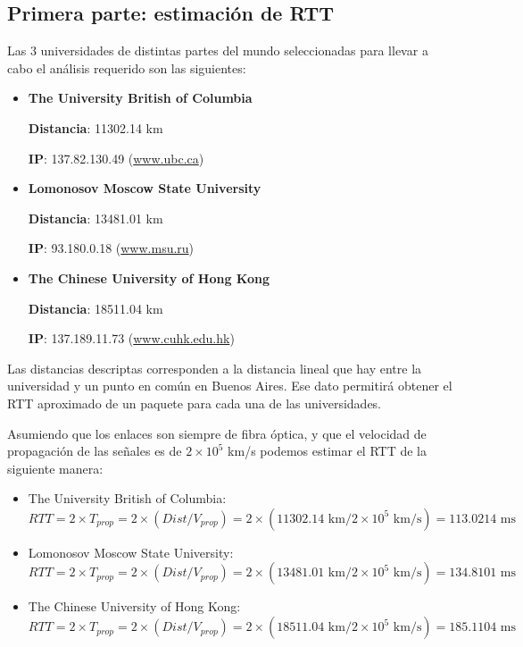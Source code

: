 \subsection{Primera parte: estimación de RTT}
Las 3 universidades de distintas partes del mundo seleccionadas para llevar a cabo el análisis requerido son las siguientes: 

\begin{itemize}
 \item {\bf The University British of Columbia}
 
	{\bf Distancia}: 11302.14 km 
	
	{\bf IP}: 137.82.130.49 (\url{www.ubc.ca}{})
 
 \item {\bf Lomonosov Moscow State University}

	{\bf Distancia}: 13481.01 km
	
	{\bf IP}: 93.180.0.18 (\url{www.msu.ru}{})
 
 \item {\bf The Chinese University of Hong Kong}

	{\bf Distancia}: 18511.04 km
	
	{\bf IP}: 137.189.11.73 (\url{www.cuhk.edu.hk})
 
\end{itemize}

Las distancias descriptas corresponden a la distancia lineal que hay entre la universidad y un punto en común en Buenos Aires. Ese dato permitirá obtener el RTT aproximado de un paquete para cada una de las universidades. 

Asumiendo que los enlaces son siempre de fibra óptica, y que el velocidad de propagación de las señales es de $2 \times 10^{5}$ km/s podemos estimar el RTT de la siguiente manera: 

\begin{itemize}
 \item The University British of Columbia: 
\begin{equation}
 	RTT = 2 \times T_{prop} = 2 \times (Dist / V_{prop}) = 2 \times (11302.14 \text{ km} / 2\times10^5 \text{ km/s}) = 113.0214 \text{ ms}
\end{equation}
 
 \item Lomonosov Moscow State University: 
 \begin{equation}
 	RTT = 2 \times T_{prop} = 2 \times (Dist / V_{prop}) = 2 \times (13481.01 \text{ km} / 2\times10^5 \text{ km/s}) = 134.8101  \text{ ms}
 \end{equation}
 
 \item The Chinese University of Hong Kong: 
 \begin{equation}
 	RTT = 2 \times T_{prop} = 2 \times (Dist / V_{prop}) = 2 \times(18511.04 \text{ km} / 2\times10^5 \text{ km/s}) = 185.1104  \text{ ms}
 \end{equation}

\end{itemize}


